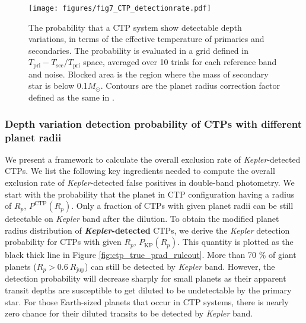 \documentclass{aastex63}
\begin{document}
    \begin{figure}[ht]
        \centering
        \texttt{[image: figures/fig7\_CTP\_detectionrate.pdf]}
        \caption{The probability that a CTP system show detectable depth variations, in terms of the effective temperature of primaries and secondaries. The probability is evaluated in a grid defined in $T_\mathrm{pri}-T_\mathrm{sec}/T_\mathrm{pri}$ space, averaged over 10 trials for each reference band and noise. Blocked area is the region where the mass of secondary star is below 0.1$M_\odot$. Contours are the planet radius correction factor defined as the same in \cite{Ziegler2016}.}
        \label{fig:ctpdetectionrate}
\end{figure}
    
    \subsubsection{Depth variation detection probability of CTPs with different planet radii}
    \label{sec:spec_exclusion_rate}

    We present a framework to calculate the overall exclusion rate of \emph{Kepler}-detected CTPs. We list the following key ingredients needed to compute the overall exclusion rate of \emph{Kepler}-detected false positives in double-band photometry. We start with the probability that the planet in CTP configuration having a radius of $R_p$, $P^\mathrm{CTP} (R_p)$. Only a fraction of CTPs with given planet radii can be still detectable on \emph{Kepler} band after the dilution. To obtain the modified planet radius distribution of \textbf{\emph{Kepler}-detected} CTPs, we derive the \emph{Kepler} detection probability for CTPs with given $R_p$, $P_\mathrm{KP}(R_p)$. This quantity is plotted as the black thick line in Figure \ref{fig:ctp_true_prad_ruleout}. More than 70 \% of giant planets ($R_p>0.6~R_\mathrm{jup}$) can still be detected by \emph{Kepler} band. However, the detection probability will decrease sharply for small planets as their apparent transit depths are susceptible to get diluted to be undetectable by the primary star. For those Earth-sized planets that occur in CTP systems, there is nearly zero chance for their diluted transits to be detected by \emph{Kepler} band.
    
\end{document}
